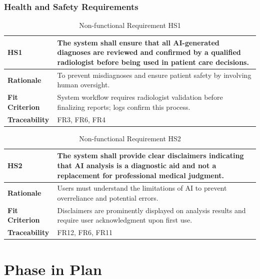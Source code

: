 \documentclass[12pt]{article}
\begin{document}
\subsubsection{Health and Safety Requirements}

\begin{table}[h!]
\centering
{}
\begin{tabular}{|p{3.5cm}|p{11.5cm}|}
\hline
\rowcolor{gray!30}
\textbf{HS1} & The system shall ensure that all AI-generated diagnoses are reviewed and confirmed by a qualified radiologist before being used in patient care decisions. \\
\hline
\textbf{Rationale} & To prevent misdiagnoses and ensure patient safety by involving human oversight. \\
\hline
\textbf{Fit Criterion} & System workflow requires radiologist validation before finalizing reports; logs confirm this process. \\
\hline
\textbf{Traceability} & FR3, FR6, FR4 \\
\hline
\end{tabular}
\caption{Non-functional Requirement HS1}
\end{table}

\begin{table}[h!]
\centering
{}
\begin{tabular}{|p{3.5cm}|p{11.5cm}|}
\hline
\rowcolor{gray!30}
\textbf{HS2} & The system shall provide clear disclaimers indicating that AI analysis is a diagnostic aid and not a replacement for professional medical judgment. \\
\hline
\textbf{Rationale} & Users must understand the limitations of AI to prevent overreliance and potential errors. \\
\hline
\textbf{Fit Criterion} & Disclaimers are prominently displayed on analysis results and require user acknowledgment upon first use. \\
\hline
\textbf{Traceability} &FR12, FR6, FR11\\
\hline
\end{tabular}
\caption{Non-functional Requirement HS2}
\end{table}

\newpage
\section{Phase in Plan}    
\end{document}
